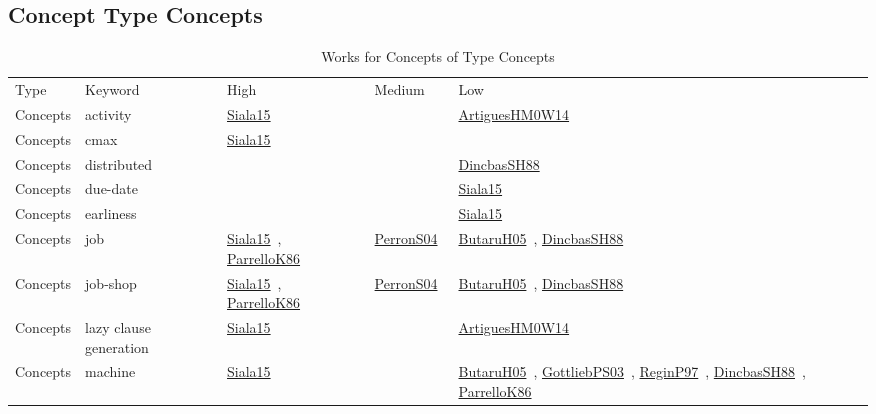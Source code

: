 \clearpage
\subsection{Concept Type Concepts}
\label{sec:Concepts}
{\scriptsize
\begin{longtable}{lp{3cm}>{\raggedright\arraybackslash}p{6cm}>{\raggedright\arraybackslash}p{6cm}>{\raggedright\arraybackslash}p{8cm}}
\rowcolor{white}\caption{Works for Concepts of Type Concepts}\\ \toprule
\rowcolor{white}Type & Keyword & High & Medium & Low\\ \midrule\endhead
\bottomrule
\endfoot
Concepts & activity & \href{../cars/works/Siala15.pdf}{Siala15}~\cite{Siala15} &  & \href{../cars/works/ArtiguesHM0W14.pdf}{ArtiguesHM0W14}~\cite{ArtiguesHM0W14}\\
Concepts & cmax & \href{../cars/works/Siala15.pdf}{Siala15}~\cite{Siala15} &  & \\
Concepts & distributed &  &  & \href{../cars/works/DincbasSH88.pdf}{DincbasSH88}~\cite{DincbasSH88}\\
Concepts & due-date &  &  & \href{../cars/works/Siala15.pdf}{Siala15}~\cite{Siala15}\\
Concepts & earliness &  &  & \href{../cars/works/Siala15.pdf}{Siala15}~\cite{Siala15}\\
Concepts & job & \href{../cars/works/Siala15.pdf}{Siala15}~\cite{Siala15}, \href{../cars/works/ParrelloK86.pdf}{ParrelloK86}~\cite{ParrelloK86} & \href{../cars/works/PerronS04.pdf}{PerronS04}~\cite{PerronS04} & \href{../cars/works/ButaruH05.pdf}{ButaruH05}~\cite{ButaruH05}, \href{../cars/works/DincbasSH88.pdf}{DincbasSH88}~\cite{DincbasSH88}\\
Concepts & job-shop & \href{../cars/works/Siala15.pdf}{Siala15}~\cite{Siala15}, \href{../cars/works/ParrelloK86.pdf}{ParrelloK86}~\cite{ParrelloK86} & \href{../cars/works/PerronS04.pdf}{PerronS04}~\cite{PerronS04} & \href{../cars/works/ButaruH05.pdf}{ButaruH05}~\cite{ButaruH05}, \href{../cars/works/DincbasSH88.pdf}{DincbasSH88}~\cite{DincbasSH88}\\
Concepts & lazy clause generation & \href{../cars/works/Siala15.pdf}{Siala15}~\cite{Siala15} &  & \href{../cars/works/ArtiguesHM0W14.pdf}{ArtiguesHM0W14}~\cite{ArtiguesHM0W14}\\
Concepts & machine & \href{../cars/works/Siala15.pdf}{Siala15}~\cite{Siala15} &  & \href{../cars/works/ButaruH05.pdf}{ButaruH05}~\cite{ButaruH05}, \href{../cars/works/GottliebPS03.pdf}{GottliebPS03}~\cite{GottliebPS03}, \href{../cars/works/ReginP97.pdf}{ReginP97}~\cite{ReginP97}, \href{../cars/works/DincbasSH88.pdf}{DincbasSH88}~\cite{DincbasSH88}, \href{../cars/works/ParrelloK86.pdf}{ParrelloK86}~\cite{ParrelloK86}\\

\end{longtable}}
